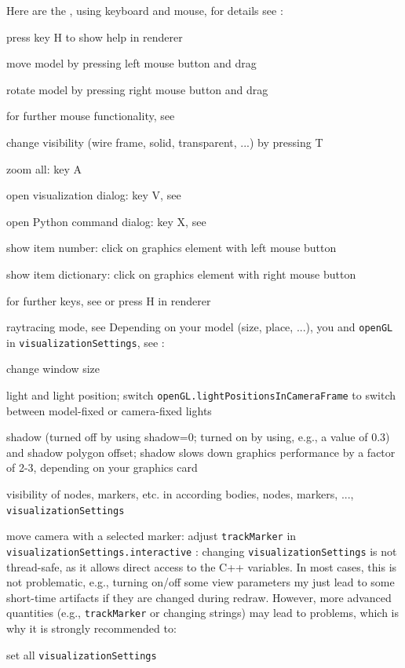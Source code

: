 \noindent Here are the , using keyboard and mouse, for details see :
\bi
  \item press key H to show help in renderer
  \item move model by pressing left mouse button and drag
  \item rotate model by pressing right mouse button and drag
  \item for further mouse functionality, see 
  \item change visibility (wire frame, solid, transparent, ...) by pressing T
  \item zoom all: key A
  \item open visualization dialog: key V, see 
  \item open Python command dialog: key X, see 
  \item show item number: click on graphics element with left mouse button
  \item show item dictionary: click on graphics element with right mouse button  
  \item for further keys, see  or press H in renderer
  \item raytracing mode, see  
\ei
%
Depending on your model (size, place, ...), you  and \texttt{openGL}  in \texttt{visualizationSettings}, see :
\bi
  \item change window size
  \item light and light position; switch \texttt{openGL.lightPositionsInCameraFrame} to switch between model-fixed or camera-fixed lights
  \item shadow (turned off by using shadow=0; turned on by using, e.g., a value of 0.3) and shadow polygon offset; shadow slows down graphics performance by a factor of 2-3, depending on your graphics card
  \item visibility of nodes, markers, etc. in according bodies, nodes, markers, ..., \texttt{visualizationSettings}
  \item move camera with a selected marker: adjust \texttt{trackMarker} in \texttt{visualizationSettings.interactive}
\ei
{}: changing \texttt{visualizationSettings} is not thread-safe, as it allows direct access to the C++ variables. 
In most cases, this is not problematic, e.g., turning on/off some view parameters my just lead to some short-time artifacts if
they are changed during redraw. However, more advanced quantities (e.g., \texttt{trackMarker} or changing strings) may lead to problems, 
which is why it is strongly recommended to:
\bi
  \item set all \texttt{visualizationSettings} 
\ei

